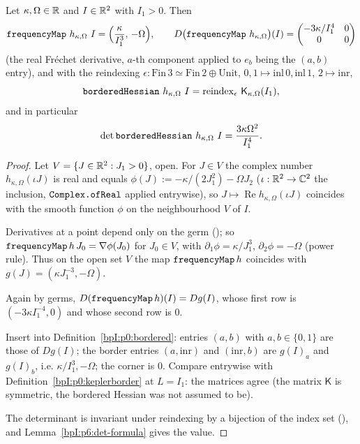 \begin{lemma}\label{bpI:p6:kep-border}
Let $\kappa,\Omega\in\mathbb{R}$ and $I\in\mathbb{R}^2$ with $I_1>0$. Then
\[
\Lean{frequencyMap}\ h_{\kappa,\Omega}\ I=\Bigl(\frac{\kappa}{I_1^3},\,-\Omega\Bigr),
\qquad
D\bigl(\Lean{frequencyMap}\ h_{\kappa,\Omega}\bigr)(I)=\begin{pmatrix}-3\kappa/I_1^4&0\\0&0\end{pmatrix}
\]
(the real Fr\'echet derivative, $a$-th component applied to $e_b$ being the $(a,b)$ entry), and with the reindexing
$\epsilon:\mathrm{Fin}\,3\simeq\mathrm{Fin}\,2\oplus\mathrm{Unit}$, $0,1\mapsto\mathrm{inl}\,0,\mathrm{inl}\,1$, $2\mapsto\mathrm{inr}$,
\[
\Lean{borderedHessian}\ h_{\kappa,\Omega}\ I=\mathrm{reindex}_\epsilon\ \mathsf K_{\kappa,\Omega}(I_1),
\]
and in particular
\[
\det\Lean{borderedHessian}\ h_{\kappa,\Omega}\ I=\frac{3\kappa\Omega^2}{I_1^4}.
\]
\end{lemma}
\begin{proof}
\label{stepI:p6:kb-real}
Let $V=\{J\in\mathbb{R}^2:J_1>0\}$, open. For $J\in V$ the complex number $h_{\kappa,\Omega}(\iota J)$ is real and equals
$\phi(J):=-\kappa/(2J_1^2)-\Omega J_2$ ($\iota:\mathbb{R}^2\to\mathbb{C}^2$ the inclusion, $\texttt{Complex.ofReal}$ applied entrywise), so
$J\mapsto\operatorname{Re}h_{\kappa,\Omega}(\iota J)$ coincides with the smooth function $\phi$ on the neighbourhood $V$ of $I$.

\label{stepI:p6:kb-grad} Derivatives at a point depend only on the germ (); so
$\texttt{frequencyMap}\,h\,J_0=\nabla\phi(J_0)$ for $J_0\in V$, with $\partial_1\phi=\kappa/J_1^3$, $\partial_2\phi=-\Omega$ (power rule).
Thus on the open set $V$ the map $\texttt{frequencyMap}\,h$ coincides with $g(J)=(\kappa J_1^{-3},-\Omega)$.

\label{stepI:p6:kb-hess} Again by germs, $D(\texttt{frequencyMap}\,h)(I)=Dg(I)$, whose first row is
$(-3\kappa I_1^{-4},0)$ and whose second row is $0$.

\label{stepI:p6:kb-entries} Insert into Definition~\ref{bpI:p0:bordered}: entries $(a,b)$ with
$a,b\in\{0,1\}$ are those of $Dg(I)$; the border entries $(a,\mathrm{inr})$ and $(\mathrm{inr},b)$ are $g(I)_a$ and $g(I)_b$, i.e. $\kappa/I_1^3,-\Omega$;
the corner is $0$. Compare entrywise with Definition~\ref{bpI:p0:keplerborder} at $L=I_1$: the matrices agree (the matrix $\mathsf K$ is symmetric,
the bordered Hessian was not assumed to be).

\label{stepI:p6:kb-det} The determinant is invariant under reindexing by a bijection of the index set (),
and Lemma~\ref{bpI:p6:det-formula} gives the value.
\end{proof}

